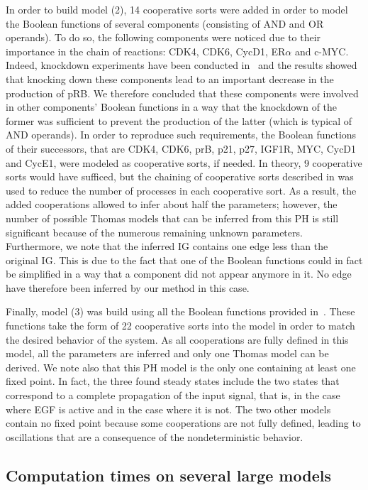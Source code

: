 In order to build model (2), 14 cooperative sorts were added in order to model the Boolean functions of several components
(consisting of AND and OR operands).
To do so, the following components were noticed due to their importance in the chain of reactions:
CDK4, CDK6, CycD1, ER$\alpha$ and c-MYC.
Indeed, knockdown experiments have been conducted in~\cite{Sahin09}
and the results showed that knocking down these components lead to an important decrease in the production of pRB.
We therefore concluded that these components were involved in other components' Boolean functions
in a way that the knockdown of the former was sufficient to prevent the production of the latter (which is typical of AND operands).
In order to reproduce such requirements, the Boolean functions of their successors,
that are CDK4, CDK6, prB, p21, p27, IGF1R, MYC, CycD1 and CycE1,
were modeled as cooperative sorts, if needed.
In theory, 9 cooperative sorts would have sufficed, but the chaining of cooperative sorts described
in  was used to reduce the number of processes in each cooperative sort.
As a result, the added cooperations allowed to infer about half the parameters;
however, the number of possible Thomas models that can be inferred from this PH is still significant
because of the numerous remaining unknown parameters.
Furthermore, we note that the inferred IG contains one edge less than the original IG. This is due to the fact that
one of the Boolean functions could in fact be simplified in a way that a component did not appear anymore in it.
No edge have therefore been inferred by our method in this case.

Finally, model (3) was build using all the Boolean functions provided in~\cite{Sahin09}.
These functions take the form of 22 cooperative sorts into the model in order to match the desired behavior of the system.
As all cooperations are fully defined in this model, all the parameters are inferred and only one Thomas model can be derived.
We note also that this PH model is the only one containing at least one fixed point.
In fact, the three found steady states include the two states that correspond to a complete propagation of the input signal,
that is, in the case where EGF is active and in the case where it is not.
The two other models contain no fixed point because some cooperations are not fully defined,
leading to oscillations that are a consequence of the nondeterministic behavior.



\subsection{Computation times on several large models}\label{ssec:cpu}

